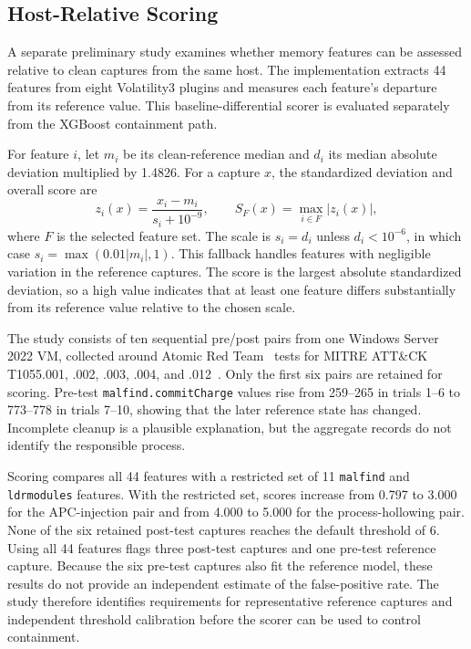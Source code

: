 \documentclass[conference]{IEEEtran}
\begin{document}
\subsection{Host-Relative Scoring}
A separate preliminary study examines whether memory features can be assessed relative
to clean captures from the same host. The implementation extracts 44 features
from eight Volatility3 plugins and measures each feature's departure from
its reference value. This baseline-differential scorer is evaluated
separately from the XGBoost containment path.

For feature $i$, let $m_i$ be its clean-reference median and $d_i$ its median
absolute deviation multiplied by 1.4826. For a capture $x$, the standardized
deviation and overall score are
\begin{equation}
z_i(x)=\frac{x_i-m_i}{s_i+10^{-9}},\qquad
S_F(x)=\max_{i\in F}|z_i(x)|,
\end{equation}
where $F$ is the selected feature set. The scale is $s_i=d_i$ unless
$d_i<10^{-6}$, in which case $s_i=\max(0.01|m_i|,1)$. This fallback handles
features with negligible variation in the reference captures. The score is
the largest absolute standardized deviation, so a high value indicates that
at least one feature differs substantially from its reference value relative
to the chosen scale.

The study consists of ten sequential pre/post pairs from one Windows Server
2022 VM, collected around Atomic Red Team~\cite{atomicredteam} tests for
MITRE ATT\&CK T1055.001, .002, .003, .004, and .012~\cite{mitre1055}.
Only the first six pairs are retained for scoring. Pre-test
\texttt{malfind.commitCharge} values rise from 259--265 in trials 1--6 to
773--778 in trials 7--10, showing that the later reference state has changed.
Incomplete cleanup is a plausible explanation, but the aggregate records
do not identify the responsible process.

Scoring compares all 44 features with a restricted set of 11
\texttt{malfind} and \texttt{ldrmodules} features. With the restricted set,
scores increase from 0.797 to 3.000 for the APC-injection pair and from
4.000 to 5.000 for the process-hollowing pair. None of the six retained
post-test captures reaches the default threshold of 6. Using all 44
features flags three post-test captures and one pre-test reference capture.
Because the six pre-test captures also fit the reference model, these
results do not provide an independent estimate of the false-positive rate.
The study therefore identifies requirements for representative reference
captures and independent threshold calibration before the scorer can be
used to control containment.
\end{document}
